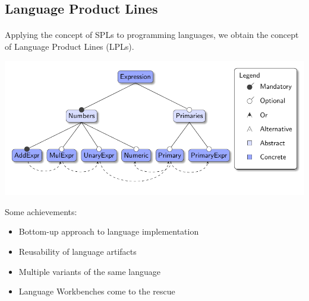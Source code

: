 \documentclass[9pt,xcolor=table,svgnames]{beamer}
\begin{document}
\subsection[LPLs]{Language Product Lines}
\begin{frame}{\secname}
    \framesubtitle{\subsecname}
    Applying the concept of SPLs to programming languages, we obtain the concept of \alert{Language Product Lines} (LPLs).

    \bigskip
    \includegraphics[width=1\textwidth]{figs/feature-model.pdf}

    \pause

    \huge Some achievements:
    \begin{itemize}
        \item \alert{Bottom-up} approach to language implementation
        \item \alert{Reusability} of language artifacts
        \item Multiple \alert{variants} of the same language
        \item \alert{Language Workbenches} come to the rescue
    \end{itemize}
\end{frame}
\end{document}
